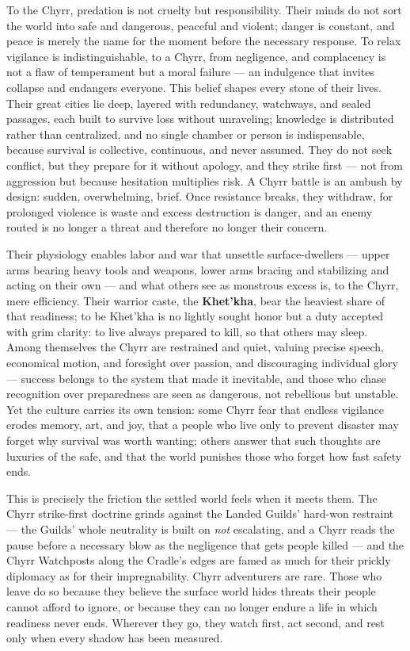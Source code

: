 To the Chyrr, predation is not cruelty but responsibility. Their minds do not sort the world into safe and dangerous, peaceful and violent; danger is constant, and peace is merely the name for the moment before the necessary response. To relax vigilance is indistinguishable, to a Chyrr, from negligence, and complacency is not a flaw of temperament but a moral failure --- an indulgence that invites collapse and endangers everyone. This belief shapes every stone of their lives. Their great cities lie deep, layered with redundancy, watchways, and sealed passages, each built to survive loss without unraveling; knowledge is distributed rather than centralized, and no single chamber or person is indispensable, because survival is collective, continuous, and never assumed. They do not seek conflict, but they prepare for it without apology, and they strike first --- not from aggression but because hesitation multiplies risk. A Chyrr battle is an ambush by design: sudden, overwhelming, brief. Once resistance breaks, they withdraw, for prolonged violence is waste and excess destruction is danger, and an enemy routed is no longer a threat and therefore no longer their concern.

Their physiology enables labor and war that unsettle surface-dwellers --- upper arms bearing heavy tools and weapons, lower arms bracing and stabilizing and acting on their own --- and what others see as monstrous excess is, to the Chyrr, mere efficiency. Their warrior caste, the \textbf{Khet'kha}, bear the heaviest share of that readiness; to be Khet'kha is no lightly sought honor but a duty accepted with grim clarity: to live always prepared to kill, so that others may sleep. Among themselves the Chyrr are restrained and quiet, valuing precise speech, economical motion, and foresight over passion, and discouraging individual glory --- success belongs to the system that made it inevitable, and those who chase recognition over preparedness are seen as dangerous, not rebellious but unstable. Yet the culture carries its own tension: some Chyrr fear that endless vigilance erodes memory, art, and joy, that a people who live only to prevent disaster may forget why survival was worth wanting; others answer that such thoughts are luxuries of the safe, and that the world punishes those who forget how fast safety ends.

This is precisely the friction the settled world feels when it meets them. The Chyrr strike-first doctrine grinds against the Landed Guilds' hard-won restraint --- the Guilds' whole neutrality is built on \textit{not} escalating, and a Chyrr reads the pause before a necessary blow as the negligence that gets people killed --- and the Chyrr Watchposts along the Cradle's edges are famed as much for their prickly diplomacy as for their impregnability. Chyrr adventurers are rare. Those who leave do so because they believe the surface world hides threats their people cannot afford to ignore, or because they can no longer endure a life in which readiness never ends. Wherever they go, they watch first, act second, and rest only when every shadow has been measured.

